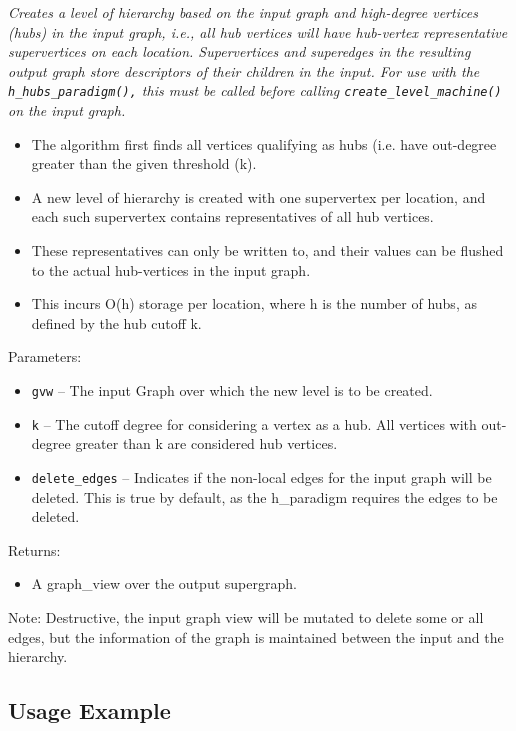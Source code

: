 \textit{
Creates a level of hierarchy based on the input graph and high-degree vertices (hubs) in the input graph, i.e., all hub vertices will have hub-vertex representative supervertices on each location. Supervertices and superedges in the resulting output graph store descriptors of their children in the input.
For use with the 
\texttt{h\_hubs\_paradigm(),}%
this must be called before calling 
\texttt{create\_level\_machine()}%
on the input graph.
}
\vspace{0.4cm}

\begin{itemize}
\item
The algorithm first finds all vertices qualifying as hubs (i.e. have out-degree greater than the given threshold (k). 
\item
A new level of hierarchy is created with one supervertex per location, and each such supervertex contains representatives of all hub vertices. 
\item
These representatives can only be written to, and their values can be flushed to the actual hub-vertices in the input graph.
\item
This incurs O(h) storage per location, where h is the number of hubs, as defined by the hub cutoff k.
\end{itemize}

Parameters:
\begin{itemize}
\item
\texttt{gvw} --
The input Graph over which the new level is to be created.
\item
\texttt{k} --
The cutoff degree for considering a vertex as a hub. All vertices with out-degree greater than k are considered hub vertices.
\item
\texttt{delete\_edges} --
Indicates if the non-local edges for the input graph will be deleted. This is true by default, as the h\_paradigm requires the edges to be deleted.
\end{itemize}

Returns:
\begin{itemize}
\item
A graph\_view over the output supergraph. 
\end{itemize}

Note:
Destructive, the input graph view will be mutated to delete some or all edges, but the information of the graph is maintained between the input and the hierarchy. 

\subsection{Usage Example} \label{sec-create-level-hubs-alg-use}

